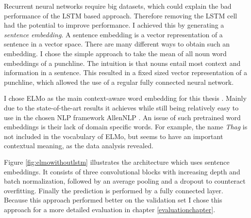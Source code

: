 \documentclass[draft,final,oneside]{vutinfth} %
\begin{document}
Recurrent neural networks require big datasets, which could explain the bad performance of the LSTM based approach. Therefore removing the LSTM cell had the potential to improve performance. I achieved this by generating a \textit{sentence embedding}. A sentence embedding is a vector representation of a sentence in a vector space. There are many different ways to obtain such an embedding. I chose the simple approach to take the mean of all noun word embeddings of a punchline. The intuition is that nouns entail most context and information in a sentence. This resulted in a fixed sized vector representation of a punchline, which allowed the use of a regular fully connected neural network.

I chose ELMo as the main context-aware word embedding for this thesis \cite{elmo}. Mainly due to the state-of-the-art results it achieves while still being relatively easy to use in the chosen NLP framework AllenNLP \cite{allennlp}. An issue of such pretrained word embeddings is their lack of domain specific words. For example, the name \textit{Thag} is not included in the vocabulary of ELMo, but seems to have an important contextual meaning, as the data analysis revealed.

Figure \ref{fig:elmowithoutlstm} illustrates the architecture which uses sentence embeddings. It consists of three convolutional blocks with increasing depth and batch normalization, followed by an average pooling and a dropout to counteract overfitting. Finally the prediction is performed by a fully connected layer. Because this approach performed better on the validation set I chose this approach for a more detailed evaluation in chapter \ref{evaluationchapter}.
\end{document}
